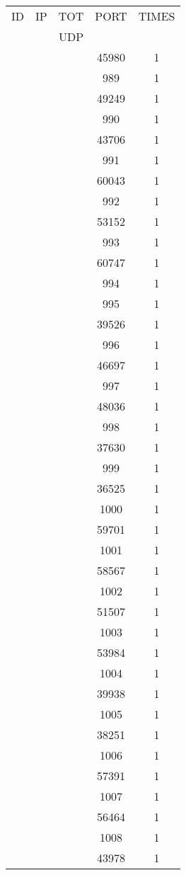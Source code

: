 \documentclass[a4paper]{scrartcl}
\begin{document}
\begin{minipage}[b]{0.5\linewidth}
\begin{tabular}{| c | c | c | c | c |}
\hline
ID & IP & TOT & PORT & TIMES \\ 
   &    & UDP &      &       \\ 
\hline
& & & 45980 & 1 \\ & & & 989 & 1 \\ & & & 49249 & 1 \\ & & & 990 & 1 \\ & & & 43706 & 1 \\ & & & 991 & 1 \\ & & & 60043 & 1 \\ & & & 992 & 1 \\ & & & 53152 & 1 \\ & & & 993 & 1 \\ & & & 60747 & 1 \\ & & & 994 & 1 \\ & & & 995 & 1 \\ & & & 39526 & 1 \\ & & & 996 & 1 \\ & & & 46697 & 1 \\ & & & 997 & 1 \\ & & & 48036 & 1 \\ & & & 998 & 1 \\ & & & 37630 & 1 \\ & & & 999 & 1 \\ & & & 36525 & 1 \\ & & & 1000 & 1 \\ & & & 59701 & 1 \\ & & & 1001 & 1 \\ & & & 58567 & 1 \\ & & & 1002 & 1 \\ & & & 51507 & 1 \\ & & & 1003 & 1 \\ & & & 53984 & 1 \\ & & & 1004 & 1 \\ & & & 39938 & 1 \\ & & & 1005 & 1 \\ & & & 38251 & 1 \\ & & & 1006 & 1 \\ & & & 57391 & 1 \\ & & & 1007 & 1 \\ & & & 56464 & 1 \\ & & & 1008 & 1 \\ & & & 43978 & 1 \\ \hline\end{tabular}\end{minipage} \hfill\begin{minipage}[b]{0.5\linewidth}\begin{tabular}{| c | c | c | c | c |}

\end{tabular}
\end{minipage}
\end{document}
